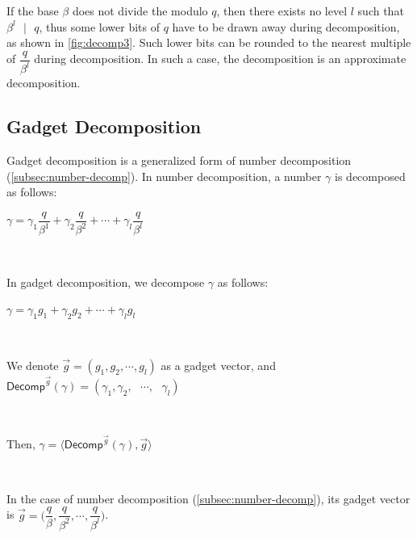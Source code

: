 If the base $\beta$ does not divide the modulo $q$, then there exists no level $l$ such that $\beta^l \text{ } | \text{ } q$, thus some lower bits of $q$ have to be drawn away during decomposition, as shown in \autoref{fig:decomp3}. Such lower bits can be rounded to the nearest multiple of $\dfrac{q}{\beta^l}$ during decomposition. In such a case, the decomposition is an approximate decomposition. 




\subsection{Gadget Decomposition}
\label{subsec:gadget-decomposition}

Gadget decomposition is a generalized form of number decomposition (\autoref{subsec:number-decomp}). In number decomposition, a number $\gamma$ is decomposed as follows: 

$\gamma = \gamma_1 \dfrac{q}{\beta^1} + \gamma_2 \dfrac{q}{\beta^2} + \cdots + \gamma_l \dfrac{q}{\beta^l} $

$ $

In gadget decomposition, we decompose $\gamma$ as follows: 

$\gamma = \gamma_1 g_1 + \gamma_2 g_2 + \cdots + \gamma_l g_l $

$ $

We denote $\vec{g} = (g_1, g_2, \cdots, g_l)$ as a gadget vector, and $\textsf{Decomp}^{\vec{g}}(\gamma) = (\gamma_1, \gamma_2, \text{ } \cdots , \text{ } \gamma_l) $

$ $

Then, $\gamma = \langle \textsf{Decomp}^{\vec{g}}(\gamma), \vec{g} \rangle $

$ $

In the case of number decomposition (\autoref{subsec:number-decomp}), its gadget vector is $\vec{g} = \Bigg(\dfrac{q}{\beta}, \dfrac{q}{\beta^2}, \cdots, \dfrac{q}{\beta^l}\Bigg)$.